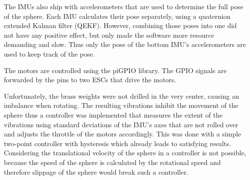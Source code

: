 The IMUs also ship with accelerometers that are used to determine the full pose of the sphere. Each IMU calculates their pose separately, using a quaternion extended Kalman filter (QEKF). However, combining those poses into one did not have any positive effect, but only made the software more resource demanding and slow. Thus only the pose of the bottom IMU's accelerometers are used to keep track of the pose.

The motors are controlled using the piGPIO library. The GPIO signals are forwarded by the pins to two ESCs that drive the motors. 

Unfortunately, the brass weights were not drilled in the very center, causing an imbalance when rotating. The resulting vibrations inhibit the movement of the sphere thus a controller was implemented that measures the extent of the vibrations using standard deviations of the IMU's axes that are not rolled over and adjusts the throttle of the motors accordingly. This was done with a simple two-point controller with hysteresis which already leads to satisfying results. Considering the translational velocity of the sphere in a controller is not possible, because the speed of the sphere is calculated by the rotational speed and therefore slippage of the sphere would break such a controller. 



